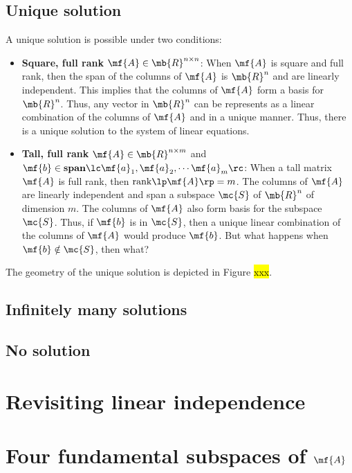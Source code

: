 \subsection{Unique solution}
A unique solution is possible under two conditions:
\begin{itemize}
    \item \textbf{Square, full rank } $\mf{A} \in \mb{R}^{n \times n}$: When $\mf{A}$ is square and full rank, then the span of the columns of $\mf{A}$ is $\mb{R}^n$ and are linearly independent. This implies that the columns of $\mf{A}$ form a basis for $\mb{R}^n$. Thus, any vector in $\mb{R}^n$ can be represents as a linear combination of the columns of $\mf{A}$ and in a unique manner. Thus, there is a unique solution to the system of linear equations. 
    
    \item \textbf{Tall, full rank } $\mf{A} \in \mb{R}^{n \times m}$ and $\mf{b} \in \textbf{span}\lc \mf{a}_1, \mf{a}_2, \cdots \mf{a}_m\rc$: When a tall matrix $\mf{A}$ is full rank, then $\text{rank}\lp \mf{A} \rp = m$. The columns of $\mf{A}$ are linearly independent and span a subspace $\mc{S}$ of $\mb{R}^n$ of dimension $m$. The columns of $\mf{A}$ also form basis for the subspace $\mc{S}$. Thus, if $\mf{b}$ is in $\mc{S}$, then a unique linear combination of the columns of $\mf{A}$ would produce $\mf{b}$. But what happens when $\mf{b} \notin \mc{S}$, then what?
\end{itemize}

The geometry of the unique solution is depicted in Figure \hl{xxx}.

\subsection{Infinitely many solutions}

\subsection{No solution}


\section{Revisiting linear independence}

\section{Four fundamental subspaces of $\mf{A}$}


